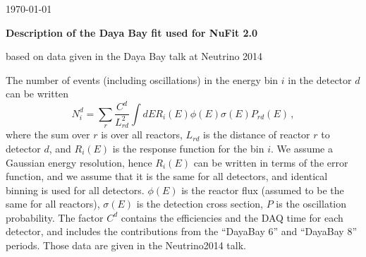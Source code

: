 \documentclass[12pt,oneside, a4paper]{article}
\begin{document}

\hfill \today

\begin{center}

\vspace{1cm}
{\Large\bf Description of the Daya Bay fit used for NuFit 2.0}
\vspace{0.5cm}



based on data given in the Daya Bay talk at Neutrino 2014 


\vspace{5mm}

\end{center}


\renewcommand{\thefootnote}{\arabic{footnote}}
\setcounter{footnote}{0}


The number of events (including oscillations) 
in the energy bin $i$ in the detector $d$ can be written
%
\begin{equation}
  N^d_i = \sum_r \frac{C^d}{L^2_{rd}} \int dE R_i(E) \phi(E) \sigma(E) P_{rd}(E) \,,
\end{equation}
% 
where the sum over $r$ is over all reactors, $L_{rd}$ is the
distance of reactor $r$ to detector $d$, and $R_i(E)$ is the response
function for the bin $i$. We assume a Gaussian energy resolution,
hence $R_i(E)$ can be written in terms of the error function, and we
assume that it is the same for all detectors, and identical binning is
used for all detectors. $\phi(E)$ is the reactor
flux (assumed to be the same for all reactors), $\sigma(E)$ is the
detection cross section, $P$ is the oscillation probability.
The factor $C^d$ contains the efficiencies and the DAQ time for each
detector, and includes the contributions from the ``DayaBay 6'' and
``DayaBay 8'' periods. Those data are given in the Neutrino2014 talk.
\end{document}

